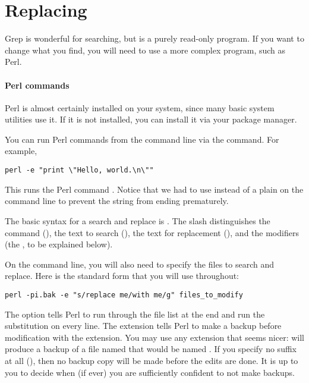 \section{Replacing}

Grep is wonderful for searching, but is a purely read-only program. If
you want to change what you find, you will need to use a more complex
program, such as Perl.

\paragraph{Perl commands} Perl is almost certainly installed on your
system, since many basic system utilities use it. If it is not
installed, you can install it via your package manager.

You can run Perl commands from the command line via the  command.
For example,
\begin{lstlisting}
perl -e "print \"Hello, world.\n\""
\end{lstlisting}
This runs the Perl command . Notice
that we had to use  instead of a plain  on the
command line to prevent the string from ending prematurely.

The basic syntax for a search and replace is .
The slash distinguishes the command (), the text to search
(), the text for replacement (), and the
modifiers (the , to be explained below).

On the command line, you will also need to specify the files to search
and replace. Here is the standard form that you will use throughout:
\begin{lstlisting}
perl -pi.bak -e "s/replace me/with me/g" files_to_modify
\end{lstlisting}


The  option tells Perl to run through the file list at the end
and run the substitution on every line. The  extension tells
Perl to make a backup before modification with the  extension.
You may use any extension that seems nicer:  will produce
a backup of a file named  that would be named .
If you specify no suffix at all (), then no backup copy will be
made before the edits are done. It is up to you to decide when (if ever) you are 
sufficiently confident to not make backups.



